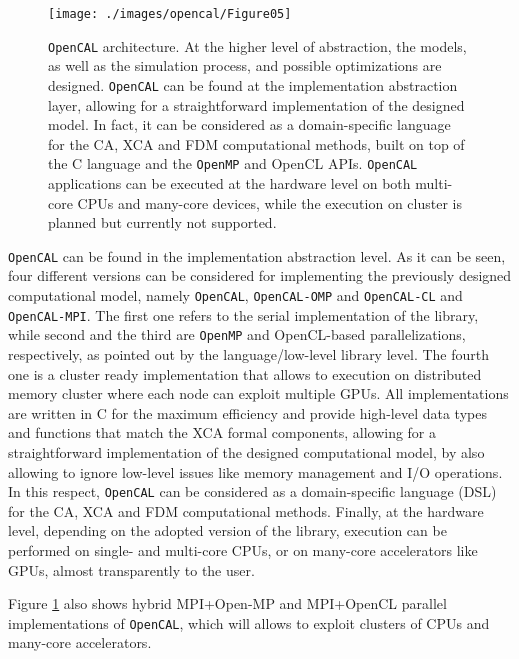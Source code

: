   \begin{figure}
  	\begin{center}
    \texttt{[image: ./images/opencal/Figure05]}
    \caption[\texttt{OpenCAL} architecture.]{\texttt{OpenCAL} architecture. At the higher level of abstraction, the models,
    	as well as the simulation process, and possible optimizations are
    	designed. \texttt{OpenCAL} can be found at the implementation abstraction
    	layer, allowing for a straightforward implementation of the designed
    	model. In fact, it can be considered as a domain-specific language for
    	the CA, XCA and FDM computational methods, built on top of the C
    	language and the \texttt{OpenMP} and OpenCL APIs. \texttt{OpenCAL} applications can be
    	executed at the hardware level on both multi-core CPUs and many-core
    	devices, while the execution on cluster is planned but currently not
    	supported.}
    \label{fig:architecture}
  \end{center}
\end{figure}
  
   \texttt{OpenCAL} can be found in the implementation abstraction level. As it
  can be seen, four different versions can be considered for
  implementing the previously designed computational model, namely
  \texttt{OpenCAL}, \texttt{OpenCAL-OMP} and \texttt{OpenCAL-CL} and \texttt{OpenCAL-MPI}. The first one refers to the   serial implementation of the library, while second and the third are \texttt{OpenMP}  and OpenCL-based parallelizations, respectively, as pointed out by
  the language/low-level library level. The fourth one is a cluster ready implementation that allows to execution on distributed memory cluster where each node can exploit multiple GPUs.
  All implementations are written in C for the maximum efficiency and provide high-level data types and functions that match the XCA formal components, allowing  for a straightforward implementation of the designed computational
  model, by also allowing to ignore low-level issues like memory
  management and I/O operations. In this respect, \texttt{OpenCAL} can be
  considered as a domain-specific language (DSL) for the CA, XCA and
  FDM computational methods. Finally, at the hardware level, depending
  on the adopted version of the library, execution can be performed on
  single- and multi-core CPUs, or on many-core accelerators like GPUs,
  almost transparently to the user.
  
   Figure \ref{fig:architecture} also shows hybrid MPI+Open-MP and
  MPI+OpenCL parallel implementations of \texttt{OpenCAL}, which will allows to
  exploit clusters of CPUs and many-core accelerators. 


